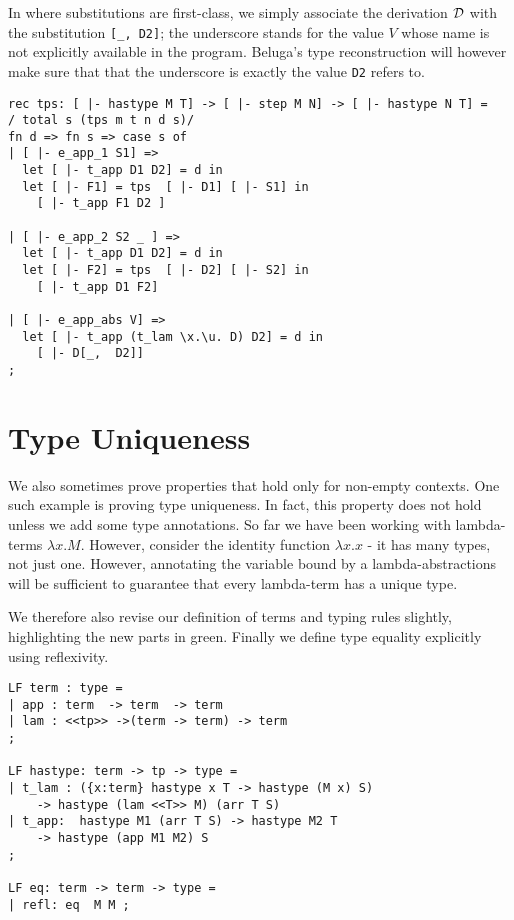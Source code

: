 In \beluga where substitutions are first-class, we simply associate the derivation ${\mathcal{D}}$ with the substitution \lstinline![_, D2]!; the underscore stands for the value $V$ whose name is not explicitly available in the program. Beluga's type
reconstruction will however make sure that that the underscore is
exactly the value \lstinline!D2! refers to.


\begin{lstlisting}
rec tps: [ |- hastype M T] -> [ |- step M N] -> [ |- hastype N T] =
/ total s (tps m t n d s)/
fn d => fn s => case s of
| [ |- e_app_1 S1] =>
  let [ |- t_app D1 D2] = d in
  let [ |- F1] = tps  [ |- D1] [ |- S1] in
    [ |- t_app F1 D2 ]

| [ |- e_app_2 S2 _ ] =>
  let [ |- t_app D1 D2] = d in
  let [ |- F2] = tps  [ |- D2] [ |- S2] in
    [ |- t_app D1 F2]

| [ |- e_app_abs V] =>
  let [ |- t_app (t_lam \x.\u. D) D2] = d in
    [ |- D[_,  D2]]
;
\end{lstlisting}


\section{Type Uniqueness}\label{chap:proofs-open-derivations}
We also sometimes prove properties that hold only for non-empty
contexts. One such example is proving type uniqueness. In fact, this property does not hold unless we add some type annotations. So far we have
been working with lambda-terms $\lambda x.M$. However, consider the identity function $\lambda x.x$ - it has many types, not just one. However, annotating the variable bound by a lambda-abstractions will be sufficient to guarantee that every lambda-term has a unique type.

We therefore also revise our definition of terms and typing rules slightly,
highlighting the new parts in green. Finally we define type equality
explicitly using reflexivity.

\begin{lstlisting}
LF term : type =
| app : term  -> term  -> term
| lam : <<tp>> ->(term -> term) -> term
;

LF hastype: term -> tp -> type =
| t_lam : ({x:term} hastype x T -> hastype (M x) S)
	-> hastype (lam <<T>> M) (arr T S)
| t_app:  hastype M1 (arr T S) -> hastype M2 T
	-> hastype (app M1 M2) S
;

LF eq: term -> term -> type =
| refl: eq  M M ;
\end{lstlisting}


